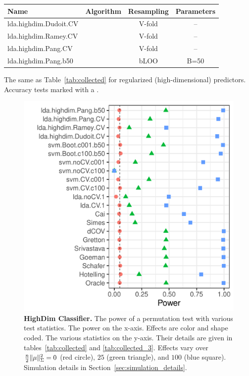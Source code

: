 \documentclass[oupdraft]{bio}
\begin{document}
\bigskip

\begin{tcolorbox}
	\centering
	\footnotesize
	\begin{tabular}{l|c|c|c}
		Name & Algorithm & Resampling &  Parameters\\ 
		\hline
		\hline
		\cue lda.highdim.Dudoit.CV & \cite{dudoit_comparison_2002} & V-fold & -- \\ 
		\cue lda.highdim.Ramey.CV & \cite{ramey_high-dimensional_2016} & V-fold & -- \\ 
		\cue lda.highdim.Pang.CV & \cite{pang_shrinkage-based_2009} & V-fold & -- \\ 
		\cue lda.highdim.Pang.b50 & \cite{pang_shrinkage-based_2009} & bLOO 	 & B=50 \\ 
	\end{tabular} 
	\captionsetup{type=table}
	\caption{\footnotesize
		The same as Table~\ref{tab:collected} for regularized (high-dimensional) predictors. 
		Accuracy tests marked with a \cue.
	} 
	\label{tab:collected_3}
\end{tcolorbox}


\begin{figure}[ht]
	\centering
	\includegraphics[width=0.5\columnwidth]{"art/file14"}
	\caption{\textbf{HighDim Classifier.} 
		The power of a permutation test with various test statistics. 
		The power on the x-axis. 
		Effects are color and shape coded. 
		The various statistics on the y-axis. 
		Their details are given in tables~\ref{tab:collected} and \ref{tab:collected_3}. 
		Effects vary over $\frac{n}{2}\Vert \mu \Vert^2_\Sigma=0$ (red circle), $25$ (green triangle), and $100$ (blue square). 
		Simulation details in Section~\ref{sec:simulation_details}.
	} 
	\label{fig:highdim}
\end{figure}
\end{document}
